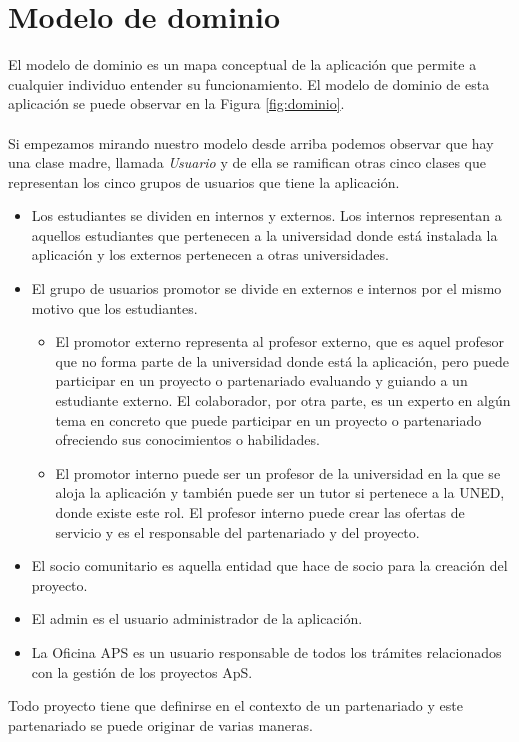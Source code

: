\documentclass[11pt]{book}
\begin{document}
	\section{Modelo de dominio}
	El modelo de dominio es un mapa conceptual de la aplicación que permite a cualquier individuo entender su funcionamiento. El modelo de dominio de esta aplicación se puede observar en la Figura \ref{fig:dominio}.\\\\
	Si empezamos mirando nuestro modelo desde arriba podemos observar que hay una clase madre, llamada \textit{Usuario} y de ella se ramifican otras cinco clases que representan los cinco grupos de usuarios que tiene la aplicación.\\
	\begin{itemize} 
		\item Los estudiantes se dividen en internos y externos. Los internos representan a aquellos estudiantes que pertenecen a la universidad donde está instalada la aplicación y los externos pertenecen a otras universidades.
		\item El grupo de usuarios promotor se divide en externos e internos por el mismo motivo que los estudiantes. 
		\begin{itemize} 
			\item El promotor externo representa al profesor externo, que es aquel profesor que no forma parte de la universidad donde está la aplicación, pero puede participar en un proyecto o partenariado evaluando y guiando a un estudiante externo. El colaborador, por otra parte, es un experto en algún tema en concreto que puede participar en un proyecto o partenariado ofreciendo sus conocimientos o habilidades. 
			\item El promotor interno puede ser un profesor de la universidad en la que se aloja la aplicación y también puede ser un tutor si pertenece a la UNED, donde existe este rol. El profesor interno puede crear las ofertas de servicio y es el responsable del partenariado y del proyecto.
		\end{itemize}
		\item El socio comunitario es aquella entidad que hace de socio para la creación del proyecto.
		\item El admin es el usuario administrador de la aplicación.
		\item La Oficina APS es un usuario responsable de todos los trámites relacionados con la gestión de los proyectos ApS. 
	\end{itemize}
	Todo proyecto tiene que definirse en el contexto de un partenariado y este partenariado se puede originar de varias maneras. \\
\end{document}

